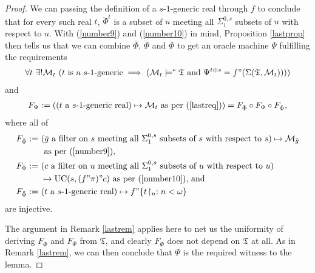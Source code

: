 \documentclass[12pt]{article}
\numberwithin{equation}{section}
\begin{document}
\begin{proof}
We can passing the definition of a $s$-$1$-generic real through $f$ to conclude that for every such real $t$, $\ddot{\Phi}^t$ is a subset of $u$ meeting all $\Sigma^{0, s}_1$ subsets of $u$ with respect to $u$. With (\ref{number9}) and (\ref{number10}) in mind, Proposition \ref{lastprop} then tells us that we can combine $\bar{\Phi}$, $\ddot{\Phi}$ and $\Phi$ to get an oracle machine $\Psi$ fulfilling the requirements 
\begin{align}\label{lastreq}
    \forall t \ \exists ! \mathcal{M}_t \ (t \text{ is a } s \text{-} 1 \text{-generic} \implies (\mathcal{M}_t \models^* \mathfrak{T} \text{ and } \Psi^{t \oplus s} = f" (\Sigma(\mathfrak{T}, \mathcal{M}_t))))
\end{align}
and 
\begin{align*}
    F_{\Psi} := ((t \text{ a } s \text{-} 1 \text{-generic real}) \mapsto \mathcal{M}_t \text{ as per (\ref{lastreq})}) = F_{\bar{\Phi}} \circ F_{\Phi} \circ F_{\ddot{\Phi}} \text{,}
\end{align*}
where all of 
\begin{align*}
    F_{\bar{\Phi}} := \ & (\bar{g} \text{ a filter on } s \text{ meeting all } \Sigma^{0, s}_1 \text{ subsets of } s \text{ with respect to } s) \mapsto \mathcal{M}_{\bar{g}} \\
    & \text{ as per (\ref{number9}),} \\ 
    F_{\Phi} := \ & (c \text{ a filter on } u \text{ meeting all } \Sigma^{0, s}_1 \text{ subsets of } u \text{ with respect to } u) \\ 
    & \mapsto \mathrm{UC}(s, (f" \pi)" c) \text{ as per (\ref{number10}), and} \\
    F_{\ddot{\Phi}} := \ & (t \text{ a } s \text{-} 1 \text{-generic real}) \mapsto f" \{t \! \restriction_n : n < \omega\} 
\end{align*}
are injective.

The argument in Remark \ref{lastrem} applies here to net us the uniformity of deriving $F_{\bar{\Phi}}$ and $F_{\Phi}$ from $\mathfrak{T}$, and clearly $F_{\ddot{\Phi}}$ does not depend on $\mathfrak{T}$ at all. As in Remark \ref{lastrem}, we can then conclude that $\Psi$ is the required witness to the lemma.
\end{proof}
\end{document}
